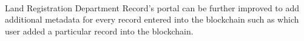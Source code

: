 \documentclass{article}
\begin{document}
            \paragraph{}
            Land Registration Department Record's portal can be further improved to add additional metadata for every record entered into the blockchain such as which user added a particular record into the blockchain.
        

    \printglossaries
    
    
\end{document}
